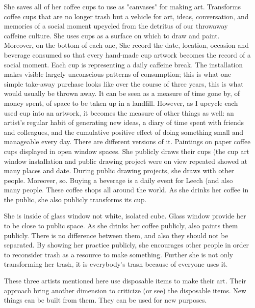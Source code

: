 She saves all of her coffee cups to use as "canvases" for making art. Transforms coffee cups that are no longer trash but a vehicle for art, ideas, conversation, and memories of a social moment upcycled from the detritus of our throwaway caffeine culture. She uses cups as a surface on which to draw and paint. Moreover, on the bottom of each one, She record the date, location, occasion and beverage consumed so that every hand-made cup artwork becomes the record of a social moment. Each cup is representing a daily caffeine break. The installation makes visible largely unconscious patterns of consumption; this is what one simple take-away purchase looks like over the course of three years, this is what would usually be thrown away. It can be seen as a measure of time gone by, of money spent, of space to be taken up in a landfill. However, as I upcycle each used cup into an artwork, it becomes the measure of other things as well: an artist's regular habit of generating new ideas, a diary of time spent with friends and colleagues, and the cumulative positive effect of doing something small and manageable every day. There are different versions of it. Paintings on paper coffee cups displayed in open window spaces. She publicly draws their cups (the cup art window installation and public drawing project were on view repeated showed at many places and date. During public drawing projects, she draws with other people. Moreover, so. Buying a beverage is a daily event for Leech (and also many people. These coffee shops all around the world. As she drinks her coffee in the public, she also publicly transforms its cup.

She is inside of glass window not white, isolated cube. Glass window provide her to be close to public space. As she drinks her coffee publicly, also paints them publicly. 
There is no difference between them, and also they should not be separated. By showing her practice publicly, she encourages other people in order to reconsider trash as a resource to make something. Further she is not only transforming her trash, it is everybody's trash because of everyone uses it.

These three artists mentioned here use disposable items to make their art. Their approach bring another dimension to criticize (or see) the disposable items. New things can be built from them. They can be used for new purposes.

